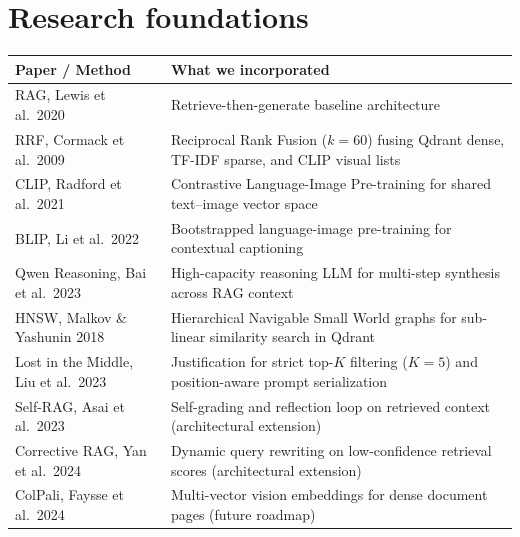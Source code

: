 \documentclass[11pt,a4paper]{article}
\begin{document}
\section{Research foundations}
{\footnotesize
\begin{center}
\begin{tabular}{@{}lp{9.0cm}@{}}
\toprule
Paper / Method & What we incorporated \\
\midrule
RAG, Lewis et al.\ 2020 & Retrieve-then-generate baseline architecture \\
RRF, Cormack et al.\ 2009 & Reciprocal Rank Fusion ($k=60$) fusing Qdrant dense, TF-IDF sparse, and CLIP visual lists \\
CLIP, Radford et al.\ 2021 & Contrastive Language-Image Pre-training for shared text--image vector space \\
BLIP, Li et al.\ 2022 & Bootstrapped language-image pre-training for contextual captioning \\
Qwen Reasoning, Bai et al.\ 2023 & High-capacity reasoning LLM for multi-step synthesis across RAG context \\
HNSW, Malkov \& Yashunin 2018 & Hierarchical Navigable Small World graphs for sub-linear similarity search in Qdrant \\
Lost in the Middle, Liu et al.\ 2023 & Justification for strict top-$K$ filtering ($K=5$) and position-aware prompt serialization \\
Self-RAG, Asai et al.\ 2023 & Self-grading and reflection loop on retrieved context (architectural extension) \\
Corrective RAG, Yan et al.\ 2024 & Dynamic query rewriting on low-confidence retrieval scores (architectural extension) \\
ColPali, Faysse et al.\ 2024 & Multi-vector vision embeddings for dense document pages (future roadmap) \\
\bottomrule
\end{tabular}
\end{center}
}

\end{document}

